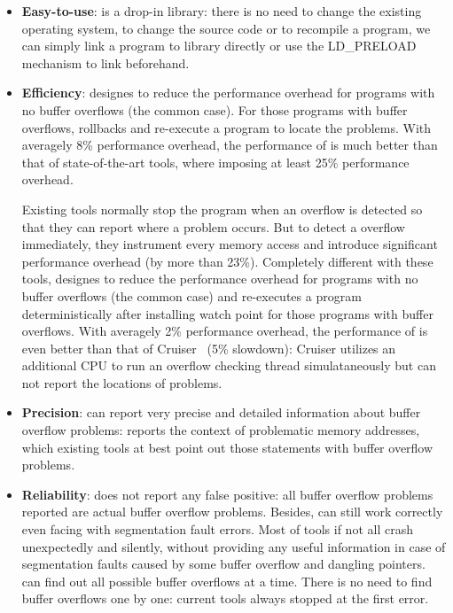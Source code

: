 \begin{itemize}
\item \textbf{Easy-to-use}:
\doubletake{} is a drop-in library: there is no need to change the
existing operating system, to change the source code or to recompile a program,
we can simply link a program to \doubletake{} library directly or 
use the LD\_PRELOAD mechanism to link \doubletake{} beforehand.

\item \textbf{Efficiency}:
\doubletake{} designes to reduce the performance overhead for 
programs with no buffer overflows (the common case). For those programs with buffer overflows, 
\doubletake{} rollbacks and re-execute a program to locate the problems. 
With averagely 8\% performance overhead, the performance of \doubletake{} is much better than 
that of state-of-the-art tools, where imposing at least 25\% performance overhead.

Existing tools normally stop the program when an overflow is detected so that they can report 
where a problem occurs. But to detect a overflow immediately,
they instrument every memory access and introduce significant 
performance overhead (by more than 23\%). 
Completely different with these tools, \doubletake{} designes to reduce the performance overhead for 
programs with no buffer overflows (the common case) and re-executes a program deterministically
after installing watch point for those programs with buffer overflows. 
With averagely 2\% performance overhead, the performance of \doubletake{} is even better than   
that of Cruiser~\cite{overflow:Cruiser} (5\% slowdown): Cruiser utilizes an additional CPU 
to run an overflow checking thread simulataneously but can not report the locations of problems.

\item \textbf{Precision}:
\doubletake{} can report very precise and detailed information about buffer overflow problems:  
\doubletake{} reports the context of problematic memory addresses, 
which existing tools at best point out those statements with buffer overflow problems.

\item \textbf{Reliability}:
\doubletake{} does not report any false positive: all buffer overflow problems reported 
are actual buffer overflow problems. 
Besides, \doubletake{} can still work correctly even facing with segmentation fault errors.
Most of tools if not all crash unexpectedly and silently, 
without providing any useful information in case of segmentation faults 
caused by some buffer overflow and dangling pointers.
\doubletake{} can find out all possible buffer overflows at a time. 
There is no need to find buffer overflows one by one: current tools
always stopped at the first error.


\end{itemize}
